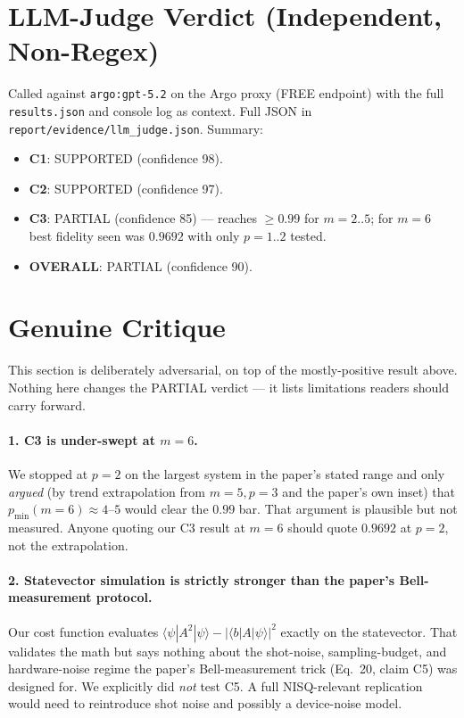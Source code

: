 \documentclass[11pt]{article}
\begin{document}
\section{LLM-Judge Verdict (Independent, Non-Regex)}
Called against \texttt{argo:gpt-5.2} on the Argo proxy (FREE endpoint) with
the full \texttt{results.json} and console log as context. Full JSON in
\texttt{report/evidence/llm\_judge.json}. Summary:
\begin{itemize}
\item \textbf{C1}: SUPPORTED (confidence 98).
\item \textbf{C2}: SUPPORTED (confidence 97).
\item \textbf{C3}: PARTIAL (confidence 85) --- reaches $\geq 0.99$ for
$m=2..5$; for $m=6$ best fidelity seen was $0.9692$ with only $p=1..2$ tested.
\item \textbf{OVERALL}: PARTIAL (confidence 90).
\end{itemize}

\section{Genuine Critique}\label{sec:critique}
This section is deliberately adversarial, on top of the mostly-positive result
above. Nothing here changes the PARTIAL verdict --- it lists limitations
readers should carry forward.

\paragraph{1. C3 is under-swept at $m=6$.} We stopped at $p=2$ on the largest
system in the paper's stated range and only \emph{argued} (by trend
extrapolation from $m=5, p=3$ and the paper's own inset) that
$p_{\min}(m{=}6) \approx 4$--$5$ would clear the $0.99$ bar. That argument is
plausible but not measured. Anyone quoting our C3 result at $m=6$ should quote
$0.9692$ at $p=2$, not the extrapolation.

\paragraph{2. Statevector simulation is strictly stronger than the paper's
Bell-measurement protocol.} Our cost function evaluates
$\langle \psi | A^2 | \psi\rangle - |\langle b | A | \psi\rangle|^2$ exactly on
the statevector. That validates the math but says nothing about the
shot-noise, sampling-budget, and hardware-noise regime the paper's
Bell-measurement trick (Eq.~20, claim C5) was designed for. We explicitly did
\emph{not} test C5. A full NISQ-relevant replication would need to reintroduce
shot noise and possibly a device-noise model.
\end{document}
